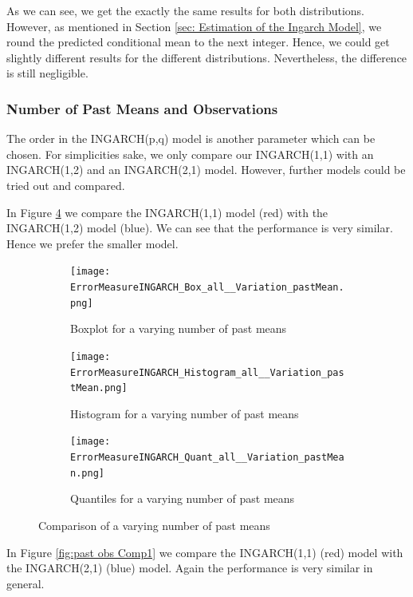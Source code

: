 As we can see, we get the exactly the same results for both distributions. However, as mentioned in Section \ref{sec: Estimation of the Ingarch Model}, we round the predicted conditional mean to the next integer. Hence, we could get slightly different results for the different distributions. Nevertheless, the difference is still negligible. %


\subsubsection{Number of Past Means and Observations}
\label{sec: Number of Past Means and Observations}

The order in the INGARCH(p,q) model is another parameter which can be chosen. For simplicities sake, we only compare our INGARCH(1,1) with an INGARCH(1,2) and an INGARCH(2,1) model. However, further models could be tried out and compared. 

In Figure \ref{fig:past means Comp1} we compare the INGARCH(1,1) model (red) with the INGARCH(1,2) model (blue). We can see that the performance is very similar. Hence we prefer the smaller model. 
\begin{figure}[htb!]
\centering
\begin{subfigure}[b]{0.45\textwidth}
\texttt{[image: ErrorMeasureINGARCH\_Box\_all\_\_Variation\_pastMean.png]}
\caption{Boxplot for a varying number of past means}
\label{fig:past means Box}
\end{subfigure}
\hfill
\begin{subfigure}[b]{0.45\textwidth}
\texttt{[image: ErrorMeasureINGARCH\_Histogram\_all\_\_Variation\_pastMean.png]}
\caption{Histogram for a varying number of past means}
\label{fig:past means Hist}
\end{subfigure}
\hfill
\begin{subfigure}[b]{0.8\textwidth}
\texttt{[image: ErrorMeasureINGARCH\_Quant\_all\_\_Variation\_pastMean.png]}
\caption{Quantiles for a varying number of past means}
\label{fig:past means Quant}
\end{subfigure}
\caption{Comparison of a varying number of past means}
\label{fig:past means Comp1}
\end{figure}


In Figure \ref{fig:past obs Comp1} we compare the INGARCH(1,1) (red) model with the INGARCH(2,1) (blue) model. Again the performance is very similar in general. 

